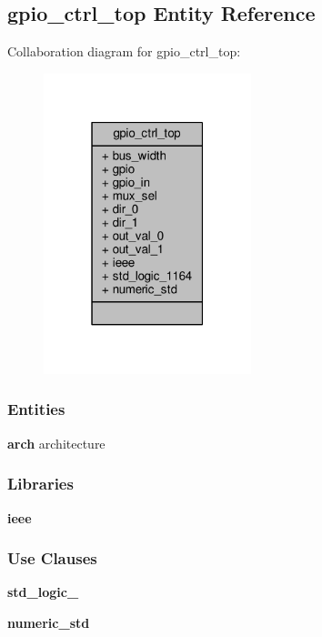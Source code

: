\subsection{gpio\+\_\+ctrl\+\_\+top Entity Reference}
\label{classgpio__ctrl__top}


Collaboration diagram for gpio\+\_\+ctrl\+\_\+top\+:\nopagebreak
\begin{figure}[H]
\begin{center}
\leavevmode
\includegraphics[width=171pt]{d6/ddd/classgpio__ctrl__top__coll__graph}
\end{center}
\end{figure}
\subsubsection*{Entities}
\begin{DoxyCompactItemize}
\item 
{\bf arch} architecture
\end{DoxyCompactItemize}
\subsubsection*{Libraries}
 \begin{DoxyCompactItemize}
\item 
{\bf ieee} 
\end{DoxyCompactItemize}
\subsubsection*{Use Clauses}
 \begin{DoxyCompactItemize}
\item 
{\bf std\+\_\+logic\+\_}   
\item 
{\bf numeric\+\_\+std}   
\end{DoxyCompactItemize}
